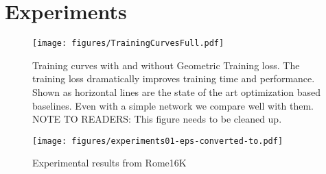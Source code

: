\documentclass[10pt,twocolumn,letterpaper]{article}
\begin{document}
\section{Experiments}

\begin{figure*}
\begin{center}
  \texttt{[image: figures/TrainingCurvesFull.pdf]}
  \end{center}
    \caption{
      Training curves with and without Geometric Training loss.
      The training loss dramatically improves training time and performance.
      Shown as horizontal lines are the state of the art optimization based baselines.
      Even with a simple network we compare well with them.
      NOTE TO READERS: This figure needs to be cleaned up.
    }
  \label{fig:short}
\end{figure*}

\begin{figure*}
\begin{center}
  \texttt{[image: figures/experiments01-eps-converted-to.pdf]}
  \end{center}
     \caption{Experimental results from Rome16K}
  \label{fig:short}
\end{figure*}
\end{document}

